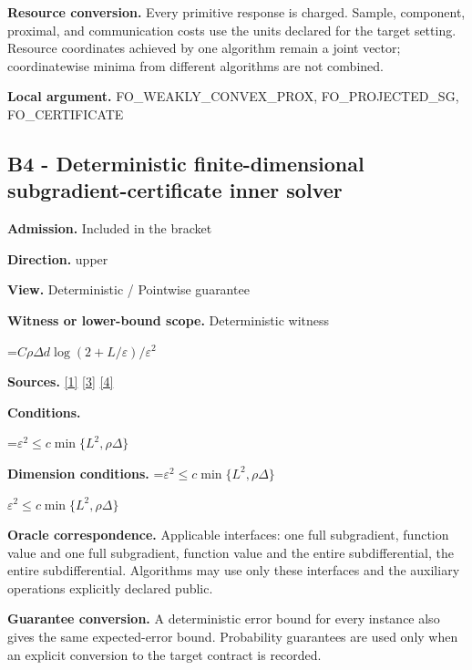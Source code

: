 \documentclass[10pt,a4paper]{article}
\newcommand{\AtlasMath}[1]{\par\begingroup\centering\setbox0=\hbox{$\displaystyle #1$}\ifdim\wd0>1.4\linewidth\typeout{ATLAS WIDE FORMULA: \the\wd0}\fi\ifdim\wd0>\linewidth\resizebox{\linewidth}{!}{\box0}\else\box0\fi\par\endgroup}
\newcommand{\AtlasInlineMath}[1]{\begingroup\setbox0=\hbox{$#1$}\ifdim\wd0>.4\linewidth\endgroup\AtlasMath{#1}\else\endgroup$#1$\fi}
\begin{document}
\textbf{Resource conversion.} Every primitive response is charged. Sample, component, proximal, and communication costs use the units declared for the target setting. Resource coordinates achieved by one algorithm remain a joint vector; coordinatewise minima from different algorithms are not combined.



\textbf{Local argument.} FO\_WEAKLY\_CONVEX\_PROX, FO\_PROJECTED\_SG, FO\_CERTIFICATE



\subsection{B4 - Deterministic finite-dimensional subgradient-certificate inner solver}


\textbf{Admission.} Included in the bracket



\textbf{Direction.} upper



\textbf{View.} Deterministic / Pointwise guarantee



\textbf{Witness or lower-bound scope.} Deterministic witness



\AtlasMath{C\rho\Delta d\log(2+L/\varepsilon)/\varepsilon^2}


\textbf{Sources.} \href{https://www2.isye.gatech.edu/~nemirovs/MOR_AccuracyCertificates.pdf}{[1]} \href{https://arxiv.org/pdf/1405.4980}{[3]} \href{https://arxiv.org/pdf/2609.20701}{[4]}



\textbf{Conditions.}
\AtlasMath{\varepsilon^2\le c\min\{L^2,\rho\Delta\}}




\textbf{Dimension conditions.} \AtlasInlineMath{\varepsilon^2\le c\min\{L^2,\rho\Delta\}}



\textbf{Oracle correspondence.} Applicable interfaces: one full subgradient, function value and one full subgradient, function value and the entire subdifferential, the entire subdifferential. Algorithms may use only these interfaces and the auxiliary operations explicitly declared public.



\textbf{Guarantee conversion.} A deterministic error bound for every instance also gives the same expected-error bound. Probability guarantees are used only when an explicit conversion to the target contract is recorded.
\end{document}
